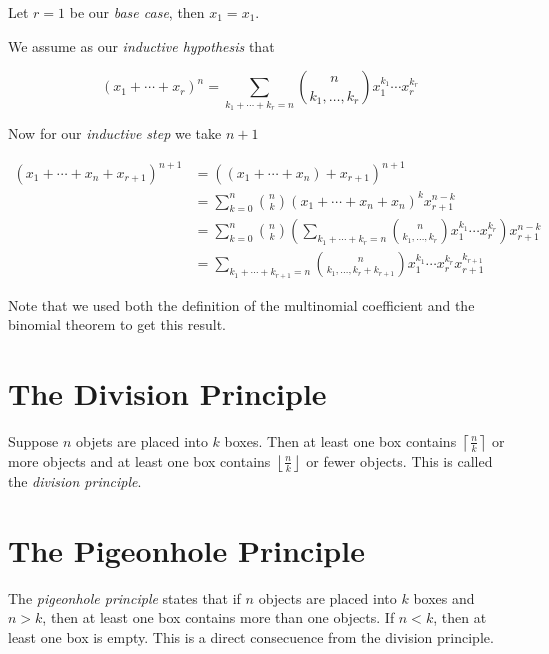 Let \(r = 1\) be our \emph{base case}, then \(x_1 = x_1\).

We assume as our \emph{inductive hypothesis} that

\[
	(x_1 + \cdots + x_r)^n = \sum_{k_1 + \cdots + k_{r} = n}  \binom{n}{k_1, \dots, k_r} x_{1}^{k_1} \cdots x_{r}^{k_r}
\]

Now for our \emph{inductive step} we take \(n + 1\)

\begin{align*}
	(x_1 + \cdots + x_{n} + x_{r + 1})^{n + 1} & = ((x_1 + \cdots + x_{n}) + x_{r + 1})^{n + 1}                                                                                                            \\
	                                           & = \sum_{k = 0}^{n}\binom{n}{k} (x_1 + \cdots + x_{n} + x_n)^{k} x_{r + 1}^{n - k}                                                                         \\
	                                           & = \sum_{k = 0}^{n}\binom{n}{k}  \left(\sum_{k_1 + \cdots + k_{r} = n}  \binom{n}{k_1, \dots, k_r} x_{1}^{k_1} \cdots x_{r}^{k_r} \right)x_{r + 1}^{n - k} \\
	                                           & = \sum_{k_1 + \cdots + k_{r + 1} = n}  \binom{n}{k_1, \dots, k_r + k_{r + 1}} x_{1}^{k_1} \cdots x_{r}^{k_r} x_{r + 1}^{k_{r + 1}}
\end{align*}

Note that we used both the definition of the multinomial coefficient and the binomial theorem to get this result.

\QED

\section{The Division Principle}

Suppose \(n\) objets are placed into \(k\) boxes. Then at least one box contains \(\left\lceil \frac{n}{k} \right\rceil\) or more
objects and at least one box contains \(\left\lfloor \frac{n}{k} \right\rfloor\) or fewer objects. This is called
the \emph{division principle}.

\section{The Pigeonhole Principle}

The \emph{pigeonhole principle} states that if \(n\) objects are placed into \(k\) boxes and \(n > k\), then
at least one box contains more than one objects. If \(n < k\), then at least one box is empty. This is a direct consecuence from the division
principle.

